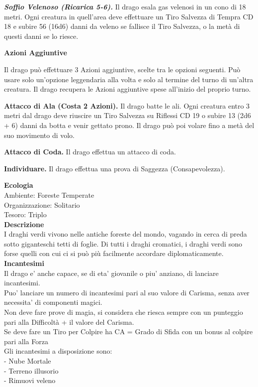 \begin{multicols}{2}
\emph{\textbf{Soffio Velenoso (Ricarica 5-6).}} Il drago esala gas velenosi in un cono di 18 metri. Ogni creatura in quell'area deve effettuare un Tiro Salvezza di Tempra CD 18 e subire 56 (16d6) danni da veleno se fallisce il Tiro Salvezza, o la metà di questi danni se lo riesce.

\textbf{Azioni Aggiuntive}

Il drago può effettuare 3 Azioni aggiuntive, scelte tra le opzioni seguenti. Può usare solo un'opzione leggendaria alla volta e solo al termine del turno di un'altra creatura. Il drago recupera le Azioni aggiuntive spese all'inizio del proprio turno.

\textbf{Attacco di Ala (Costa 2 Azioni).} Il drago batte le ali. Ogni creatura entro 3 metri dal drago deve riuscire un Tiro Salvezza su Riflessi CD 19 o subire 13 (2d6 + 6) danni da botta e venir  gettato prono. Il drago può poi volare fino a metà del suo movimento di volo.

\textbf{Attacco di Coda.} Il drago effettua un attacco di coda.

\textbf{Individuare.} Il drago effettua una prova di Saggezza (Consapevolezza).

\textbf{Ecologia}\\
Ambiente: Foreste Temperate\\
Organizzazione: Solitario\\
Tesoro: Triplo\\
\textbf{Descrizione}\\
I draghi verdi vivono nelle antiche foreste del mondo, vagando in cerca di preda sotto giganteschi tetti di foglie. Di tutti i draghi cromatici, i draghi verdi sono forse quelli con cui ci si può più facilmente accordare diplomaticamente.\\
\textbf{Incantesimi}\\
Il drago e' anche capace, se di eta' giovanile o piu' anziano, di lanciare incantesimi.\\
Puo' lanciare un numero di incantesimi pari al suo valore di Carisma, senza aver necessita' di componenti magici.\\
Non deve fare prove di magia, si considera che riesca sempre con un punteggio pari alla Difficoltà + il valore del Carisma.\\
Se deve fare un Tiro per Colpire ha CA = Grado di Sfida con un bonus al colpire pari alla Forza\\
Gli incantesimi a disposizione sono:\\
- Nube Mortale\\
- Terreno illusorio\\
- Rimuovi veleno\\



\end{multicols}

